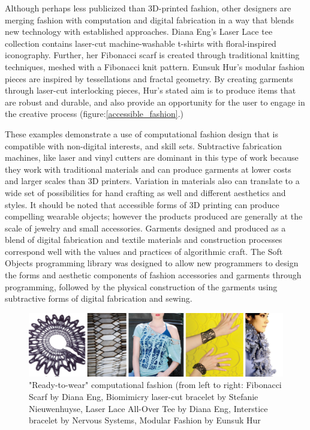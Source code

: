 Although perhaps less publicized than 3D-printed fashion, other  designers are merging fashion with computation and digital fabrication in a way that blends new technology with established approaches. Diana Eng's Laser Lace tee collection contains laser-cut machine-washable t-shirts with floral-inspired iconography. Further, her Fibonacci scarf is created through traditional knitting techniques, meshed with a Fibonacci knit pattern. Eunsuk Hur's modular fashion pieces are inspired by tessellations and fractal geometry. By creating garments through laser-cut interlocking pieces, Hur's stated aim is to produce items that are robust and durable, and also provide an opportunity for the user to engage in the creative process (figure:\ref{accessible_fashion}.)

These examples demonstrate a use of computational fashion design that is compatible with non-digital interests, and skill sets. Subtractive fabrication machines, like laser and vinyl cutters are dominant in this type of work because they work with traditional materials and can produce garments at  lower costs and larger scales than 3D printers. Variation in materials also can translate to a wide set of possibilities for hand crafting as well and different aesthetics and styles. It should be noted that accessible forms of 3D printing can produce compelling wearable objects; however the products produced are generally at the scale of jewelry and small accessories. Garments designed and produced as a blend of digital fabrication and textile materials and construction processes correspond well with the values and practices of algorithmic craft. The Soft Objects programming library was designed to allow new programmers to design the forms and aesthetic components of fashion accessories and garments through programming, followed by the physical construction of the garments using subtractive forms of digital fabrication and sewing. 

\begin{center}
\begin{figure}[h!]
\includegraphics[width=6.5in]{images/accessible_fashion.png}
\caption{"Ready-to-wear" computational fashion (from left to right: Fibonacci Scarf by Diana Eng, Biomimicry laser-cut bracelet by Stefanie Nieuwenhuyse, Laser Lace All-Over Tee by Diana Eng, Interstice bracelet by Nervous Systems, Modular Fashion by Eunsuk Hur}
\label{fig:accessible_fashion}
\end{figure}
\end{center}
		


